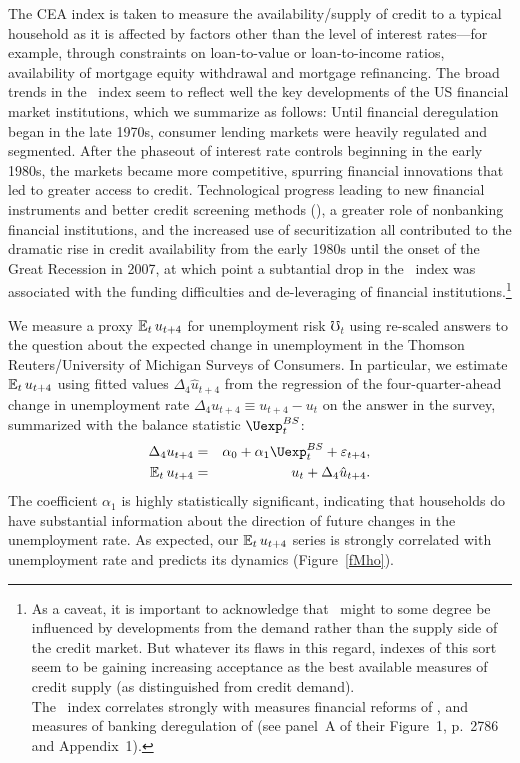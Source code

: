 \documentclass[titlepage]{\econtex}
\begin{document}
The CEA index is taken to measure the availability/supply of credit to a typical household as it is affected by factors other than the level of interest rates---for example, through constraints on loan-to-value or loan-to-income ratios, availability of mortgage equity withdrawal and mortgage refinancing. The broad trends in the \CEA\ index seem to reflect well the key developments of the US financial market institutions, which we summarize as follows: Until financial deregulation began in the late 1970s, consumer lending markets were heavily regulated and segmented. After the phaseout of interest rate controls beginning in the early 1980s, the markets became more competitive, spurring financial innovations that led to greater access to credit. Technological progress leading to new financial instruments and better credit screening methods (\cite{pjInfo}), a greater role of nonbanking financial institutions, and the increased use of securitization all contributed to the dramatic rise in credit availability from the early 1980s until the onset of the Great Recession in 2007, at which point a subtantial drop in the \CEA\ index was associated with the funding difficulties and de-leveraging of financial institutions.\footnote{As a caveat, it is important to acknowledge that \CEA\ might to some degree be influenced by developments from the demand rather than the supply side of the credit market.  But whatever its flaws in this regard, indexes of this sort seem to be gaining increasing acceptance as the best available measures of credit supply (as distinguished from credit demand).\\
  The \CEA\ index correlates strongly with measures financial reforms of \cite{abiadEtAl_FinReforms}, and measures of banking deregulation of \cite{demyanykEtAl_JoF07_deregulation} (see panel~A of their Figure~1, p.\ 2786 and Appendix~1).   }

We measure a proxy $\operatorname{\mathbb{E}}_t u_{t+4}$ for unemployment risk $\mho_t$ using re-scaled answers to the question about the expected change in unemployment in the Thomson Reuters/University of Michigan Surveys of Consumers. %
 In particular, we estimate $\operatorname{\mathbb{E}}_t u_{t+4}$ using fitted values $\Delta_4 \hat{u}_{t+4}$ from the regression of the four-quarter-ahead change in unemployment rate $\Delta_4 u_{t+4}\equiv u_{t+4}-u_t$ on the answer in the survey, summarized with the balance statistic $\Uexp^{BS}_t$:
\begin{eqnarray*}
\Delta_4 u_{t+4} &=& \alpha_0+\alpha_1\Uexp^{BS}_t+\varepsilon_{t+4},\\
\Ex_t u_{t+4}&=&u_t+ \Delta_4 \hat{u}_{t+4}.
\end{eqnarray*}
The coefficient $\alpha_{1}$ is highly statistically significant, indicating that households do have substantial information about the direction of future changes in the unemployment rate.  As expected, our $\operatorname{\mathbb{E}}_{t} u_{t+4}$ series is strongly correlated with unemployment rate and predicts its dynamics (Figure~\ref{fMho}).%
\end{document}
